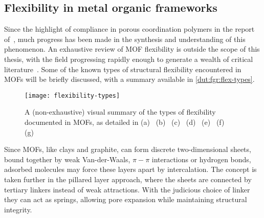 \subsection{Flexibility in metal organic frameworks}

Since the highlight of compliance in porous coordination polymers 
in the report of~\citet{kitagawaFunctionalPorousCoordination2004},
much progress has been made in the synthesis and understanding
of this phenomenon. An exhaustive review of MOF flexibility is 
outside the scope of this thesis, with the field progressing 
rapidly enough to generate a wealth of critical
literature~\cite{schneemannFlexibleMetalOrganic2014, %
fereyHybridPorousSolids2008, liMetalOrganicFrameworks2012, %
haldarInterpenetrationCoordinationPolymers2015, %
stassenUpdatedRoadmapIntegration2017, %
vanduyfhuysThermodynamicInsightStimuliresponsive2018, %
murdockApproachesSynthesizingBreathing2014}.
Some of the known types of structural flexibility encountered in MOFs
will be briefly discussed, with a summary available in 
\autoref{dut:fgr:flex-types}. 

\begin{figure}[htb]
    \centering
    
    \texttt{[image: flexibility-types]}%
    \caption{A (non-exhaustive) visual summary of the types of
    flexibility documented in MOFs, as detailed in 
    (a)~\citet{liHydrogenBondregulatedMicroporous2001}
    (b)~\citet{kitauraPorousCoordinationPolymerCrystals2003}
    (c)~\citet{kitauraPillaredLayerCoordinationPolymer2002}
    (d)~\citet{kepertVersatileFamilyInterconvertible2000,%
    kitauraPorousCoordinationPolymerCrystals2003}
    (e)~\citet{nelsonSupercriticalProcessingRoute2009}
    (f)~\citet{fairen-jimenezOpeningGateFramework2011}
    (g)~\citet{bourrellyDifferentAdsorptionBehaviors2005, %
    serreExplanationVeryLarge2007}}%
    \label{dut:fgr:flex-types}
    
\end{figure}

Since MOFs, like clays and graphite, can form discrete 
two-dimensional sheets, bound together by weak Van-der-Waals,
\( \pi-\pi \) interactions or hydrogen bonds,
adsorbed molecules may force these layers apart by 
intercalation. The concept is taken further in the 
pillared layer approach, where the sheets are connected 
by tertiary linkers instead of weak attractions. With the 
judicious choice of linker they can act as springs, allowing
pore expansion while maintaining structural integrity.

